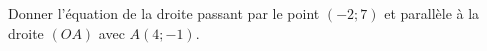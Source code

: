 
\begin{exercice}\label{exosmath-0612}

    Donner l'équation de la droite passant par le point \( (-2;7)\) et parallèle à la droite \( (OA)\) avec \( A(4;-1)\).

\end{exercice}
